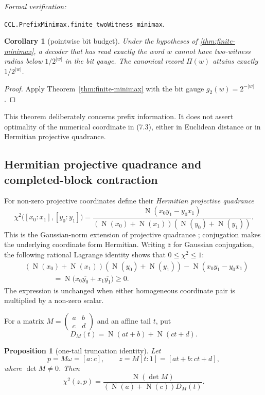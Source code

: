 \documentclass[10pt]{article}
\newtheorem{proposition}[theorem]{Proposition}
\newtheorem{corollary}[theorem]{Corollary}
\theoremstyle{definition}
\theoremstyle{remark}
\newcommand{\Norm}{\operatorname{N}}
\newcommand{\leanref}[1]{\par\smallskip\noindent
  \emph{Formal verification:}\par\nobreak
  {\raggedright\nolinkurl{#1}.\par}}
\newcommand{\Proj}[2]{[#1:#2]}
\newcommand{\mat}[4]{\begin{pmatrix}#1&#2\\#3&#4\end{pmatrix}}
\begin{document}
\leanref{CCL.PrefixMinimax.finite_twoWitness_minimax}

\begin{corollary}[pointwise bit budget]\label{cor:bit-budget}
Under the hypotheses of \autoref{thm:finite-minimax}, a decoder that has read exactly the word $w$ cannot have two-witness radius below $1/2^{|w|}$ in the bit gauge.  The canonical record $\Pi(w)$ attains exactly $1/2^{|w|}$.
\end{corollary}

\begin{proof}
Apply Theorem~\ref{thm:finite-minimax} with the bit gauge
$g_2(w)=2^{-|w|}$.
\end{proof}

This theorem deliberately concerns prefix information.  It does not assert
optimality of the numerical coordinate in (7.3), either in Euclidean
distance or in Hermitian projective quadrance.

\subsection{Hermitian projective quadrance and completed-block contraction}\label{subsec:projective-quadrance-contraction}

For non-zero projective coordinates define their \emph{Hermitian projective
quadrance}
\[
 \chi^2\bigl(\Proj{x_0}{x_1},\Proj{y_0}{y_1}\bigr)
 =\frac{\Norm(x_0y_1-y_0x_1)}
 {(\Norm(x_0)+\Norm(x_1))(\Norm(y_0)+\Norm(y_1))}.
\tag{7.5}
\]
This is the Gaussian-norm extension of projective quadrance
\cite{wildberger-projective}; conjugation makes the underlying coordinate
form Hermitian.  Writing $\overline{z}$ for Gaussian conjugation, the
following rational Lagrange identity shows that $0\le\chi^2\le1$:
\[
 \begin{aligned}
 &(\Norm(x_0)+\Norm(x_1))(\Norm(y_0)+\Norm(y_1))
   -\Norm(x_0y_1-y_0x_1)\\
 &\hspace{4em}=
 \Norm\bigl(x_0\overline{y_0}+x_1\overline{y_1}\bigr)\ge0.
 \end{aligned}
\tag{7.6}
\]
The expression is unchanged when either homogeneous coordinate pair is multiplied by a non-zero scalar.

For a matrix $M=\mat{a}{b}{c}{d}$ and an affine tail $t$, put
\[
 D_M(t)=\Norm(at+b)+\Norm(ct+d).
\]

\begin{proposition}[one-tail truncation identity]\label{prop:projective-quadrance-truncation}
Let
\[
 p=M\omega=\Proj{a}{c},\qquad
 z=M\Proj{t}{1}=\Proj{at+b}{ct+d},
\]
where $\det M\ne0$.  Then
\[
 \chi^2(z,p)
 =\frac{\Norm(\det M)}
 {(\Norm(a)+\Norm(c))D_M(t)}.
\tag{7.7}
\]
\end{proposition}
\end{document}
